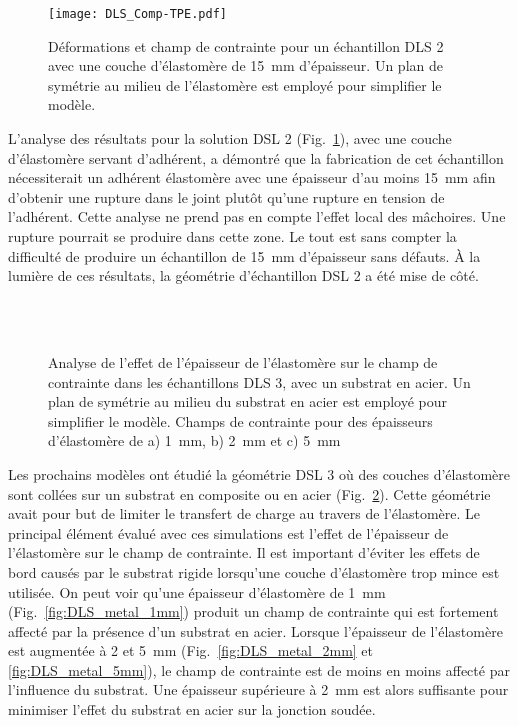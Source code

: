\begin{figure}[h]
	\centering
	\texttt{[image: DLS\_Comp-TPE.pdf]}
	\caption{Déformations et champ de contrainte pour un échantillon DLS 2 avec une couche d'élastomère de \SI[locale=FR]{15}{\milli\metre} d'épaisseur. Un plan de symétrie au milieu de l'élastomère est employé pour simplifier le modèle.}
	\label{fig:DLS_comp_TPE}
\end{figure}
\FloatBarrier

L'analyse des résultats pour la solution DSL 2 (Fig.~\ref{fig:DLS_comp_TPE}), avec une couche d'élastomère servant d'adhérent, a démontré que la fabrication de cet échantillon nécessiterait un adhérent élastomère avec une épaisseur d'au moins \SI[locale=FR]{15}{\milli\metre} afin d'obtenir une rupture dans le joint plutôt qu'une rupture en tension de l'adhérent. 
Cette analyse ne prend pas en compte l'effet local des mâchoires. 
Une rupture pourrait se produire dans cette zone. 
Le tout est sans compter la difficulté de produire un échantillon de \SI[locale=FR]{15}{\milli\metre} d'épaisseur sans défauts. 
À la lumière de ces résultats, la géométrie d'échantillon DSL 2 a été mise de côté.

\begin{figure}[h!]
	\centering
	 \\
	 \\
	\caption{Analyse de l'effet de l'épaisseur de l'élastomère sur le champ de contrainte dans les échantillons DLS 3, avec un substrat en acier. Un plan de symétrie au milieu du substrat en acier est employé pour simplifier le modèle. Champs de contrainte pour des épaisseurs d'élastomère de a) \SI{1}{\milli\metre}, b) \SI{2}{\milli\metre} et c) \SI{5}{\milli\metre}}
	\label{fig:DLS_metal}
\end{figure}

Les prochains modèles ont étudié la géométrie DSL 3 où des couches d'élastomère sont collées sur un substrat en composite ou en acier (Fig.~\ref{fig:DLS_metal}). 
Cette géométrie avait pour but de limiter le transfert de charge au travers de l'élastomère. 
Le principal élément évalué avec ces simulations est l'effet de l'épaisseur de l'élastomère sur le champ de contrainte. 
Il est important d'éviter les effets de bord causés par le substrat rigide lorsqu'une couche d'élastomère trop mince est utilisée. 
On peut voir qu'une épaisseur d'élastomère de \SI[locale=FR]{1}{\milli\metre} (Fig.~\ref{fig:DLS_metal_1mm}) produit un champ de contrainte qui est fortement affecté par la présence d'un substrat en acier. 
Lorsque l'épaisseur de l'élastomère est augmentée à 2 et \SI[locale=FR]{5}{\milli\metre} (Fig.~\ref{fig:DLS_metal_2mm} et \ref{fig:DLS_metal_5mm}), le champ de contrainte est de moins en moins affecté par l'influence du substrat. 
Une épaisseur supérieure à \SI[locale=FR]{2}{\milli\metre} est alors suffisante pour minimiser l'effet du substrat en acier sur la jonction soudée. 

